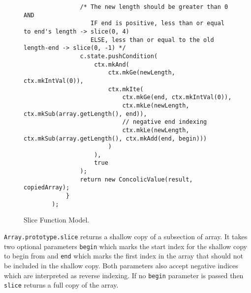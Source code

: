 \documentclass[]{final_report}
\begin{document}
\begin{figure}[t]
\begin{lstlisting}
                /* The new length should be greater than 0 AND 
                   IF end is positive, less than or equal to end's length -> slice(0, 4)
                   ELSE, less than or equal to the old length-end -> slice(0, -1) */
                c.state.pushCondition(
                    ctx.mkAnd(
                        ctx.mkGe(newLength, ctx.mkIntVal(0)), 
                        ctx.mkIte(
                            ctx.mkGe(end, ctx.mkIntVal(0)), 
                            ctx.mkLe(newLength, ctx.mkSub(array.getLength(), end)),
                            // negative end indexing 
                            ctx.mkLe(newLength, ctx.mkSub(array.getLength(), ctx.mkAdd(end, begin)))
                        )
                    ),
                    true
                );
                return new ConcolicValue(result, copiedArray);             
            }
        );
\end{lstlisting}
\caption{\label{fig:slice-func-model} Slice Function Model.}
\end{figure}

\lstinline|Array.prototype.slice| returns a shallow copy of a subsection of array. It takes two optional parameters \lstinline|begin| which marks the start index for the shallow copy to begin from and \lstinline|end| which marks the first index in the array that should not be included in the shallow copy. Both parameters also accept negative indices which are interpreted as reverse indexing. If no \lstinline{begin} parameter is passed then \lstinline{slice} returns a full copy of the array.
\end{document}

